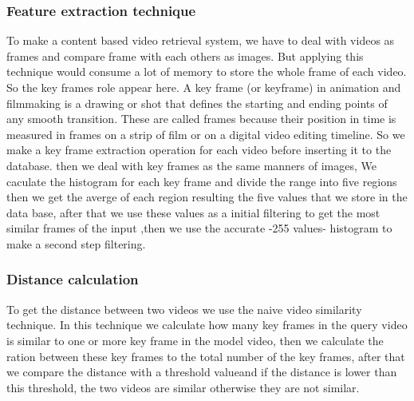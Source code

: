 \subsubsection{Feature extraction technique}
\vskip 0.2in
To make a content based video retrieval system, we have to deal with videos as frames and compare frame with each others as images.
But applying this technique would consume a lot of memory to store the whole frame of each video.
So the key frames role appear here.
\vskip 0.2in
A key frame (or keyframe) in animation and filmmaking is a drawing or shot that defines the starting 
and ending points of any smooth transition. These are called frames because their position in time is measured in 
frames on a strip of film or on a digital video editing timeline.
\vskip 0.2in
So we make a key frame extraction operation for each video before inserting it to the database.
then we deal with key frames as the same manners of images, We caculate the histogram for each key frame and divide the range into 
five regions then we get the averge of each region resulting the five values that we store in the data base, after that we use these values
as a initial filtering to get the most similar frames of the input ,then we use the accurate -255 values- histogram to make a second step filtering.
\vskip 0.2in
\subsubsection{Distance calculation}
To get the distance between two videos we use the naive video similarity technique.
In this technique we calculate how many key frames in the query video is similar to one or more key frame in the model video, then 
we calculate the ration between these key frames to the total number of the key frames, after that we compare the distance with a threshold valueand if the 
distance is lower than this threshold, the two videos are similar otherwise they are not similar.

